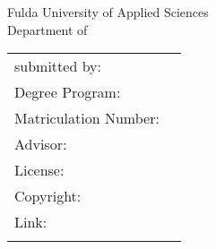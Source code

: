 \begin{titlepage}
	\begin{center}
		\huge{\sffamily\textbf{\doctitle}}\\[8ex] %
		\Large{\textbf{\docworktype}}\\[1.5ex] %
		\Large{Fulda University of Applied Sciences}\\
		\Large{Department of \docdepartment}\\[11ex]
		\normalsize
		\begin{table}[H]
			\centering
			\begin{tabular}{ll}
				submitted by:  & \quad \docauthor\\[1.2ex]
				Degree Program: & \quad \docdegreeprogramm\\[1.2ex]
				Matriculation Number: & \quad \docmatriculationnumber\\[1.2ex]
				Advisor:  & \quad \docadvisor\\[8ex] %
				License:  & \quad \doclicense\\[1.2ex]
				Copyright:  & \quad \doccopyright\\[1.2ex]
				Link:  & \quad \doclink\\[1.2ex]
				\\[26ex]
			\end{tabular}
		\end{table}
		\docdate %
	\end{center}
\end{titlepage}
%